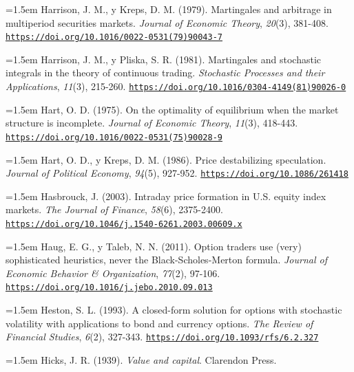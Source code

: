 \documentclass[10pt,a4paper]{article}
\begin{document}
\noindent\hangindent=1.5em Harrison, J. M., y Kreps, D. M. (1979). Martingales and arbitrage in multiperiod securities markets. \textit{Journal of Economic Theory}, \textit{20}(3), 381-408. \href{https://doi.org/10.1016/0022-0531(79)90043-7}{\nolinkurl{https://doi.org/10.1016/0022-0531(79)90043-7}}

\noindent\hangindent=1.5em Harrison, J. M., y Pliska, S. R. (1981). Martingales and stochastic integrals in the theory of continuous trading. \textit{Stochastic Processes and their Applications}, \textit{11}(3), 215-260. \href{https://doi.org/10.1016/0304-4149(81)90026-0}{\nolinkurl{https://doi.org/10.1016/0304-4149(81)90026-0}}

\noindent\hangindent=1.5em Hart, O. D. (1975). On the optimality of equilibrium when the market structure is incomplete. \textit{Journal of Economic Theory}, \textit{11}(3), 418-443. \href{https://doi.org/10.1016/0022-0531(75)90028-9}{\nolinkurl{https://doi.org/10.1016/0022-0531(75)90028-9}}

\noindent\hangindent=1.5em Hart, O. D., y Kreps, D. M. (1986). Price destabilizing speculation. \textit{Journal of Political Economy}, \textit{94}(5), 927-952. \href{https://doi.org/10.1086/261418}{\nolinkurl{https://doi.org/10.1086/261418}}

\noindent\hangindent=1.5em Hasbrouck, J. (2003). Intraday price formation in U.S. equity index markets. \textit{The Journal of Finance}, \textit{58}(6), 2375-2400. \href{https://doi.org/10.1046/j.1540-6261.2003.00609.x}{\nolinkurl{https://doi.org/10.1046/j.1540-6261.2003.00609.x}}

\noindent\hangindent=1.5em Haug, E. G., y Taleb, N. N. (2011). Option traders use (very) sophisticated heuristics, never the Black-Scholes-Merton formula. \textit{Journal of Economic Behavior \& Organization}, \textit{77}(2), 97-106. \href{https://doi.org/10.1016/j.jebo.2010.09.013}{\nolinkurl{https://doi.org/10.1016/j.jebo.2010.09.013}}

\noindent\hangindent=1.5em Heston, S. L. (1993). A closed-form solution for options with stochastic volatility with applications to bond and currency options. \textit{The Review of Financial Studies}, \textit{6}(2), 327-343. \href{https://doi.org/10.1093/rfs/6.2.327}{\nolinkurl{https://doi.org/10.1093/rfs/6.2.327}}

\noindent\hangindent=1.5em Hicks, J. R. (1939). \textit{Value and capital}. Clarendon Press.
\end{document}
